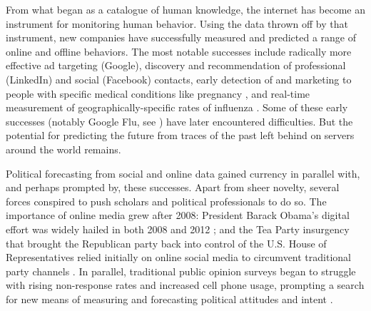 \documentclass{article}
\begin{document}

From what began as a catalogue of human knowledge, the internet has
become an instrument for monitoring human behavior. Using the data
thrown off by that instrument, new companies have successfully
measured and predicted a range of online and offline behaviors. The
most notable successes include radically more effective ad targeting
(Google), discovery and recommendation of professional (LinkedIn) and
social (Facebook) contacts, early detection of and marketing to people
with specific medical conditions like pregnancy \citep{hill2012},
and real-time measurement of geographically-specific rates of influenza
\citep{ginsberg2008detecting}. Some of these early successes (notably Google
Flu, see \cite{butler2013google,41763}) have later encountered
difficulties. But the potential for predicting the future from 
traces of the past left behind on servers around the world remains.

Political forecasting from social and online data gained currency in
parallel with, and perhaps prompted by, these successes. Apart from
sheer novelty, several forces conspired to push scholars and political
professionals to do so. The importance of online media grew after
2008: President Barack Obama's digital effort was widely hailed in
both 2008 and 2012
\citep{smith2009internet,wallsten2010yes,levenshus2010online}; and the
Tea Party insurgency that brought the Republican party back into
control of the U.S. House of Representatives relied initially on
online social media to circumvent traditional party channels
\citep{williamson2011tea}. In parallel, traditional public opinion
surveys began to struggle with rising non-response rates and increased
cell phone usage, prompting a search for new means of measuring and
forecasting political attitudes and intent
\citep{keeter2006gauging,kohut2012assessing,christian2010assessing,boyle2013sampling,viera2013mail}.
\end{document}
